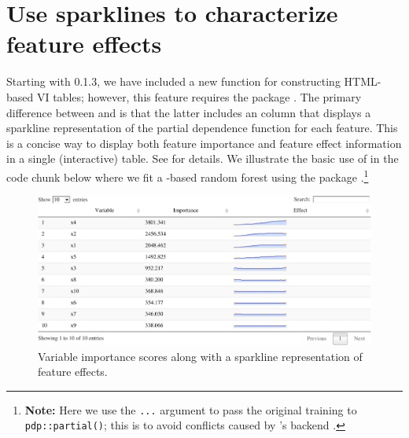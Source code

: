 \section{Use sparklines to characterize feature effects}

Starting with  0.1.3, we have included a new function
 for constructing HTML-based VI tables; however,
this feature requires the  package \citep{R-DT}. The primary
difference between  and  is that the
latter includes an  column that displays a sparkline
representation of the partial dependence function for each feature. This
is a concise way to display both feature importance and feature effect
information in a single (interactive) table. See
 for details. We illustrate the basic use of
 in the code chunk below where we fit a
-based random forest using the  package
\citep{R-mlr3}.\footnote{\textbf{Note:} Here we use the \texttt{...}
  argument to pass the original training to \texttt{pdp::partial()};
  this is to avoid conflicts caused by 's 
  backend \citep{R-data.table}.}

\begin{Schunk}
\begin{figure}[!htb]

{\centering \includegraphics[width=1\linewidth]{greenwell-boehmke_files/figure-latex/sparklines-1} 

}

\caption[Variable importance scores along with a sparkline representation of feature effects]{Variable importance scores along with a sparkline representation of feature effects.}\label{fig:sparklines}
\end{figure}
\end{Schunk}

